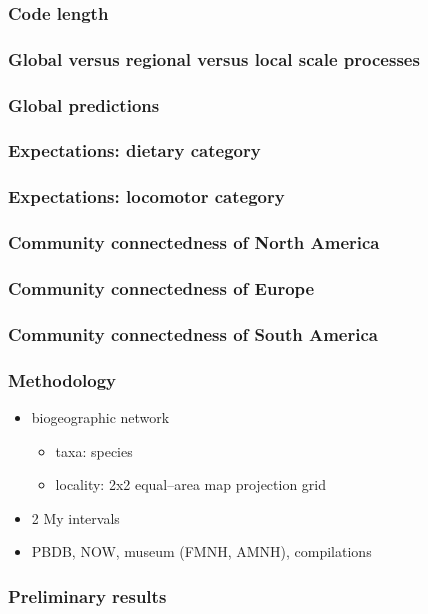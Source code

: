 \documentclass{beamer} \usepackage{amsmath,amsthm}
\begin{document}
\begin{frame}
  \frametitle{Code length}
\end{frame}

\begin{frame}
  \frametitle{Global versus regional versus local scale processes}
\end{frame}

\begin{frame}
  \frametitle{Global predictions}
\end{frame}

\begin{frame}
  \frametitle{Expectations: dietary category}
\end{frame}

\begin{frame}
  \frametitle{Expectations: locomotor category}
\end{frame}

\begin{frame}
  \frametitle{Community connectedness of North America}
\end{frame}

\begin{frame}
  \frametitle{Community connectedness of Europe}
\end{frame}

\begin{frame}
  \frametitle{Community connectedness of South America}
\end{frame}

\begin{frame}
  \frametitle{Methodology}

  \begin{itemize}
    \item biogeographic network
      \begin{itemize}
        \item taxa: species
        \item locality: 2x2 equal--area map projection grid
      \end{itemize}
    \item 2 My intervals
    \item PBDB, NOW, museum (FMNH, AMNH), compilations
  \end{itemize}
\end{frame}

\begin{frame}
  \frametitle{Preliminary results}
\end{frame}
\end{document}
